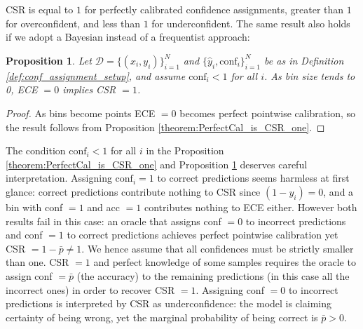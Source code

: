 \documentclass{article}
\theoremstyle{plain}
\newtheorem{theorem}{Proposition}
\theoremstyle{definition}
\theoremstyle{remark}
\begin{document}
CSR is equal to $1$ for perfectly calibrated confidence assignments, greater than $1$ for overconfident, and less than $1$ for underconfident. The same result also holds if we adopt a Bayesian instead of a frequentist approach:
\bigskip

\begin{theorem} \label{theorem:bin_size_zero_and_ECE_zero_is_CSR_one}
Let $\mathcal{D} = \{(x_i, y_i)\}_{i=1}^N$ and $\{\hat{y}_i, \text{conf}_i\}_{i=1}^N$ be as in Definition \ref{def:conf_assignment_setup}, and assume  $\text{conf}_i < 1$ for all $i$. As bin size tends to 0, ECE $= 0$ implies CSR $= 1$.
\end{theorem}
\begin{proof}
As bins become points ECE $ = 0$ becomes perfect pointwise calibration, so the result follows from Proposition \ref{theorem:PerfectCal_is_CSR_one}.
\end{proof}
\bigskip


The condition $\text{conf}_i < 1$ for all $i$ in the Proposition \ref{theorem:PerfectCal_is_CSR_one} and Proposition \ref{theorem:bin_size_zero_and_ECE_zero_is_CSR_one} deserves careful interpretation. Assigning $\text{conf}_i = 1$ to correct predictions seems harmless at first glance: correct predictions contribute nothing to CSR since $(1-y_i) = 0$, and a bin with conf $= 1$ and acc $= 1$ contributes nothing to ECE either. However both results fail in this case: an oracle that assigns conf $= 0$ to incorrect predictions and conf $= 1$ to correct predictions achieves perfect pointwise calibration yet CSR $= 1 - \bar{p} \neq 1$. We hence assume that all confidences must be strictly smaller than one. CSR $= 1$ and perfect knowledge of some samples requires the oracle to assign conf $= \bar{p}$ (the accuracy) to the remaining predictions (in this case all the incorrect ones) in order to recover CSR $= 1$. Assigning conf $= 0$ to incorrect predictions is interpreted by CSR as underconfidence: the model is claiming certainty of being wrong, yet the marginal probability of being correct is $\bar{p} > 0$.
\bigskip
\end{document}
